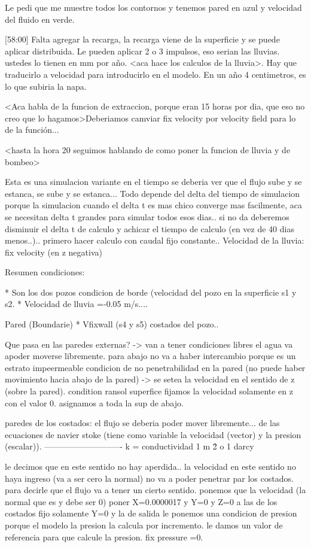 \documentclass[10pt,a4paper,final]{article}
\begin{document}
Le pedi que me muestre todos los contornos y tenemos pared en azul y velocidad del fluido en verde.


[58:00]
Falta agregar la recarga, la recarga viene de la superficie y se puede aplicar distribuida. Le pueden aplicar 2 o 3 impulsos, eso serian las lluvias. ustedes lo tienen en mm por año. <aca hace los calculos de la lluvia>. Hay que traducirlo a velocidad para introducirlo en el modelo. En un año 4 centimetros, es lo que subiria la napa.

<Aca habla de la funcion de extraccion, porque eran 15 horas por dia, que eso no creo que lo hagamos>Deberiamos camviar fix velocity por velocity field para lo de la función...

<hasta la hora 20 seguimos hablando de como poner la funcion de lluvia y de bombeo>


Esta es una simulacion variante en el tiempo se deberia ver que el flujo sube y se estanca, se sube y se estanca...
Todo depende del delta del tiempo de simulacion porque la simulacion cuando el delta t es mas chico converge mas facilmente, aca se necesitan delta t grandes para simular todos esos dias.. si no da deberemos disminuir el delta t de calculo y achicar el tiempo de calculo (en vez de 40 dias menos..)..
primero hacer calculo con caudal fijo constante..
Velocidad de la lluvia: fix velocity (en z negativa)

Resumen condiciones:

	* Son los dos pozos condicion de borde (velocidad del pozo en la superficie s1 y s2.
	* Velocidad de lluvia =-0.05 m/s.... 

	Pared (Boundarie)
		* Vfixwall (s4 y s5) costados del pozo..

Que pasa en las paredes externas? -> van a tener condiciones libres el agua va  apoder moverse libremente.
para abajo no va a haber intercambio porque es un estrato impeermeable
condicion de no penetrabilidad en la pared (no puede haber movimiento hacia abajo de la pared) -> se setea la velocidad en el sentido de z (sobre la pared). condition ransol superfice fijamos la velocidad solamente en z con el valor 0. asignamos a toda la sup de abajo.

paredes de los costados:
	el flujo se deberia poder mover libremente... de las ecuaciones de navier stoke	(tiene como variable la velocidad (vector) y la presion (escalar)).
----------------------------
	k = conductividad 1\/ m \^2 o 1 \/ darcy

le decimos que en este sentido no hay aperdida.. la velocidad en este sentido no haya ingreso (va  a ser cero la normal) no va  a poder penetrar par los costados. para decirle que el flujo va a tener un cierto sentido. ponemos que la velocidad (la normal que es y debe ser 0)
poner X=0.0000017 y Y=0 y Z=0
a las de los costados fijo solamente Y=0
y la de salida le ponemos una condicion de presion porque el modelo la presion la calcula por incremento. le damos un valor de referencia para que calcule la presion. fix pressure =0.
\end{document}
